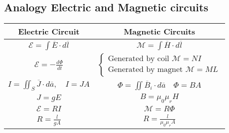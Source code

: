 \documentclass{myclass}
\begin{document}
\subsection{Analogy Electric and Magnetic circuits}
\begin{center}
\begin{tabular}{|c|c|}
  \hline
  Electric Circuit & Magnetic Circuits \\
\hline
  $ \mathcal{E} = \int \overline{E} \cdot d\overline{l}$ & $\mathcal{M} = \int \overline{H}\cdot d\overline{l}$\\
  \hline
  $\displaystyle\mathcal{E} = -\frac{d\Phi}{dt}$ & $\begin{cases}
    \text{Generated by coil } \mathcal{M} = NI \\
	\text{Generated by magnet }  \mathcal{M} = ML 
  \end{cases}$ \\
  \hline
	$\displaystyle I = \iint_S \overline{J}\cdot d\overline{a}, \quad I = JA$ & $\displaystyle \Phi = \iint \overline{B}_i \cdot d\overline{a} \quad \Phi = BA$ \\
	\hline
	$J = gE$  & $B = \mu_0\mu_r H$ \\
	\hline
	$\mathcal{E} = RI$ & $\mathcal{M}=R\Phi$ \\
	\hline
	$\displaystyle R = \frac{l}{gA}$ & $\displaystyle R = \frac{l}{\mu_0\mu_r A}$ \\
	\hline


\end{tabular}
\end{center}
\end{document}

